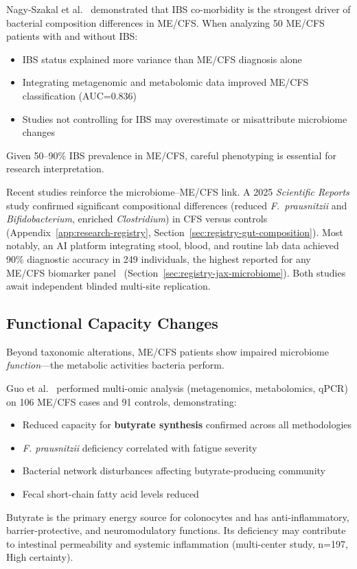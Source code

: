 \begin{warning}
\label{warn:ibs-confound}
Nagy-Szakal et al.~\cite{NagySzakal2017} demonstrated that IBS co-morbidity is the strongest driver of bacterial composition differences in ME/CFS. When analyzing 50 ME/CFS patients with and without IBS:
\begin{itemize}
    \item IBS status explained more variance than ME/CFS diagnosis alone
    \item Integrating metagenomic and metabolomic data improved ME/CFS classification (AUC=0.836)
    \item Studies not controlling for IBS may overestimate or misattribute microbiome changes
\end{itemize}
Given 50--90\% IBS prevalence in ME/CFS, careful phenotyping is essential for research interpretation.
\end{warning}

Recent studies reinforce the microbiome--ME/CFS link.  A 2025
\textit{Scientific Reports} study confirmed significant compositional
differences (reduced \textit{F.\ prausnitzii} and \textit{Bifidobacterium},
enriched \textit{Clostridium}) in CFS versus
controls~\cite{GutMicrobialComposition2025}
(Appendix~\ref{app:research-registry},
Section~\ref{sec:registry-gut-composition}).  Most notably, an AI platform
integrating stool, blood, and routine lab data achieved 90\% diagnostic
accuracy in 249 individuals, the highest reported for any ME/CFS biomarker
panel~\cite{JAXmicrobiome2025}
(Section~\ref{sec:registry-jax-microbiome}).  Both studies await independent
blinded multi-site replication.

\subsection{Functional Capacity Changes}

Beyond taxonomic alterations, ME/CFS patients show impaired microbiome \textit{function}---the metabolic activities bacteria perform.

\begin{achievement}
\label{ach:butyrate-deficiency}
Guo et al.~\cite{ButyrateDeficiency2023} performed multi-omic analysis (metagenomics, metabolomics, qPCR) on 106 ME/CFS cases and 91 controls, demonstrating:
\begin{itemize}
    \item Reduced capacity for \textbf{butyrate synthesis} confirmed across all methodologies
    \item \textit{F. prausnitzii} deficiency correlated with fatigue severity
    \item Bacterial network disturbances affecting butyrate-producing community
    \item Fecal short-chain fatty acid levels reduced
\end{itemize}
Butyrate is the primary energy source for colonocytes and has anti-inflammatory, barrier-protective, and neuromodulatory functions. Its deficiency may contribute to intestinal permeability and systemic inflammation (multi-center study, n=197, High certainty).
\end{achievement}

